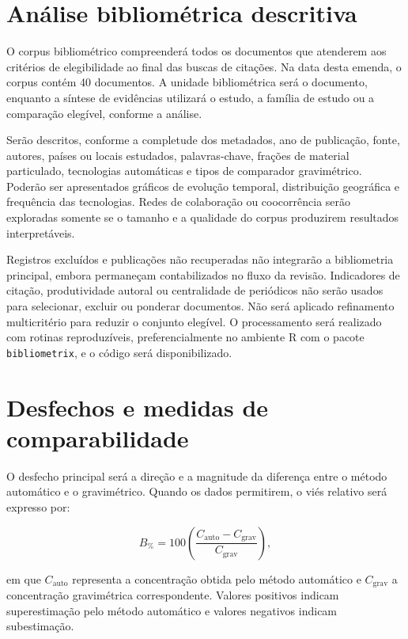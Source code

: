 \documentclass[11pt,a4paper]{article}
\begin{document}
\section{Análise bibliométrica descritiva}

O corpus bibliométrico compreenderá todos os documentos que atenderem aos critérios de
elegibilidade ao final das buscas de citações. Na data desta emenda, o corpus contém 40
documentos. A unidade bibliométrica será o documento, enquanto a síntese de evidências
utilizará o estudo, a família de estudo ou a comparação elegível, conforme a análise.

Serão descritos, conforme a completude dos metadados, ano de publicação, fonte,
autores, países ou locais estudados, palavras-chave, frações de material particulado,
tecnologias automáticas e tipos de comparador gravimétrico. Poderão ser apresentados
gráficos de evolução temporal, distribuição geográfica e frequência das tecnologias.
Redes de colaboração ou coocorrência serão exploradas somente se o tamanho e a
qualidade do corpus produzirem resultados interpretáveis.

Registros excluídos e publicações não recuperadas não integrarão a bibliometria
principal, embora permaneçam contabilizados no fluxo da revisão. Indicadores de
citação, produtividade autoral ou centralidade de periódicos não serão usados para
selecionar, excluir ou ponderar documentos. Não será aplicado refinamento
multicritério para reduzir o conjunto elegível. O processamento será realizado com
rotinas reproduzíveis, preferencialmente no ambiente R com o pacote
\texttt{bibliometrix}, e o código será disponibilizado.

\section{Desfechos e medidas de comparabilidade}

O desfecho principal será a direção e a magnitude da diferença entre o método
automático e o gravimétrico. Quando os dados permitirem, o viés relativo será expresso
por:

\begin{equation}
  B_{\%}=100\left(\frac{C_{\mathrm{auto}}-C_{\mathrm{grav}}}
  {C_{\mathrm{grav}}}\right),
\end{equation}

em que $C_{\mathrm{auto}}$ representa a concentração obtida pelo método automático e
$C_{\mathrm{grav}}$ a concentração gravimétrica correspondente. Valores positivos
indicam superestimação pelo método automático e valores negativos indicam
subestimação.
\end{document}
